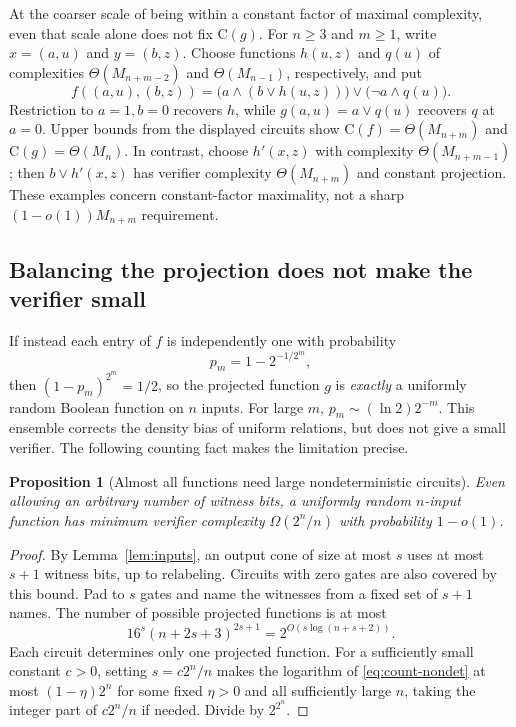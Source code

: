 \documentclass[11pt]{article}
\newtheorem{proposition}[theorem]{Proposition}
\theoremstyle{definition}
\theoremstyle{remark}
\newcommand{\C}{\mathrm{C}}
\begin{document}
At the coarser scale of being within a constant factor of maximal
complexity, even that scale alone does not fix $\C(g)$. For $n\ge3$
and $m\ge1$, write $x=(a,u)$ and $y=(b,z)$. Choose functions
$h(u,z)$ and $q(u)$ of complexities $\Theta(M_{n+m-2})$ and
$\Theta(M_{n-1})$, respectively, and put
\[
 f((a,u),(b,z))=
  \bigl(a\land(b\lor h(u,z))\bigr)
   \lor\bigl(\neg a\land q(u)\bigr).
\]
Restriction to $a=1,b=0$ recovers $h$, while
$g(a,u)=a\lor q(u)$ recovers $q$ at $a=0$. Upper bounds from the
displayed circuits show $\C(f)=\Theta(M_{n+m})$ and
$\C(g)=\Theta(M_n)$. In contrast, choose $h'(x,z)$ with complexity
$\Theta(M_{n+m-1})$; then $b\lor h'(x,z)$ has verifier complexity
$\Theta(M_{n+m})$ and constant projection. These
examples concern constant-factor maximality, not a sharp
$(1-o(1))M_{n+m}$ requirement.

\subsection{Balancing the projection does not make the verifier small}

If instead each entry of $f$ is independently one with probability
\[
 p_m=1-2^{-1/2^m},
\]
then $(1-p_m)^{2^m}=1/2$, so the projected function $g$ is
\emph{exactly} a uniformly random Boolean function on $n$ inputs.
For large $m$, $p_m\sim(\ln2)2^{-m}$. This ensemble corrects the
density bias of uniform relations, but does not give a small verifier.
The following counting fact makes the limitation precise.

\begin{proposition}[Almost all functions need large nondeterministic
circuits]\label{prop:nondet-count}
Even allowing an arbitrary number of witness bits, a uniformly random
$n$-input function has minimum verifier complexity
$\Omega(2^n/n)$ with probability $1-o(1)$.
\end{proposition}
\begin{proof}
By Lemma~\ref{lem:inputs}, an output cone of size at most $s$ uses at
most $s+1$ witness bits, up to relabeling. Circuits with zero gates
are also covered by this bound. Pad to $s$ gates and name the
witnesses from a fixed set of $s+1$ names. The number of possible
projected functions is at most
\begin{equation}\label{eq:count-nondet}
 16^s(n+2s+3)^{2s+1}=2^{O(s\log(n+s+2))}.
\end{equation}
Each circuit determines only one projected function. For a sufficiently
small constant $c>0$, setting $s=c2^n/n$ makes the logarithm of
\eqref{eq:count-nondet} at most $(1-\eta)2^n$ for some fixed
$\eta>0$ and all sufficiently large $n$, taking the integer part of
$c2^n/n$ if needed. Divide by $2^{2^n}$.
\end{proof}
\end{document}
